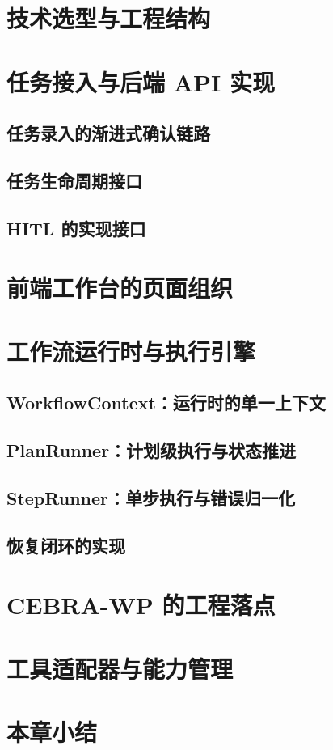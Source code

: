 
\section{技术选型与工程结构}


\section{任务接入与后端 API 实现}

\subsection{任务录入的渐进式确认链路}
\subsection{任务生命周期接口}
\subsection{HITL 的实现接口}


\section{前端工作台的页面组织}


\section{工作流运行时与执行引擎}

\subsection{WorkflowContext：运行时的单一上下文}
\subsection{PlanRunner：计划级执行与状态推进}
\subsection{StepRunner：单步执行与错误归一化}
\subsection{恢复闭环的实现}


\section{CEBRA-WP 的工程落点}


\section{工具适配器与能力管理}


\section{本章小结}

